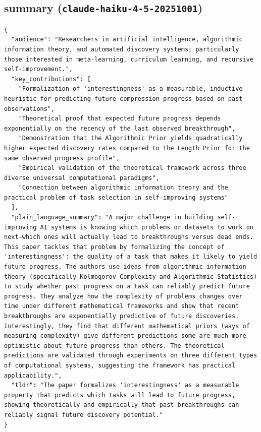 \documentclass[11pt]{article}
\begin{document}
\subsection*{summary (\texttt{claude-haiku-4-5-20251001})}
\begin{verbatim}
{
  "audience": "Researchers in artificial intelligence, algorithmic information theory, and automated discovery systems; particularly those interested in meta-learning, curriculum learning, and recursive self-improvement.",
  "key_contributions": [
    "Formalization of 'interestingness' as a measurable, inductive heuristic for predicting future compression progress based on past observations",
    "Theoretical proof that expected future progress depends exponentially on the recency of the last observed breakthrough",
    "Demonstration that the Algorithmic Prior yields quadratically higher expected discovery rates compared to the Length Prior for the same observed progress profile",
    "Empirical validation of the theoretical framework across three diverse universal computational paradigms",
    "Connection between algorithmic information theory and the practical problem of task selection in self-improving systems"
  ],
  "plain_language_summary": "A major challenge in building self-improving AI systems is knowing which problems or datasets to work on next—which ones will actually lead to breakthroughs versus dead ends. This paper tackles that problem by formalizing the concept of 'interestingness': the quality of a task that makes it likely to yield future progress. The authors use ideas from algorithmic information theory (specifically Kolmogorov Complexity and Algorithmic Statistics) to study whether past progress on a task can reliably predict future progress. They analyze how the complexity of problems changes over time under different mathematical frameworks and show that recent breakthroughs are exponentially predictive of future discoveries. Interestingly, they find that different mathematical priors (ways of measuring complexity) give different predictions—some are much more optimistic about future progress than others. The theoretical predictions are validated through experiments on three different types of computational systems, suggesting the framework has practical applicability.",
  "tldr": "The paper formalizes 'interestingness' as a measurable property that predicts which tasks will lead to future progress, showing theoretically and empirically that past breakthroughs can reliably signal future discovery potential."
}
\end{verbatim}
\end{document}
